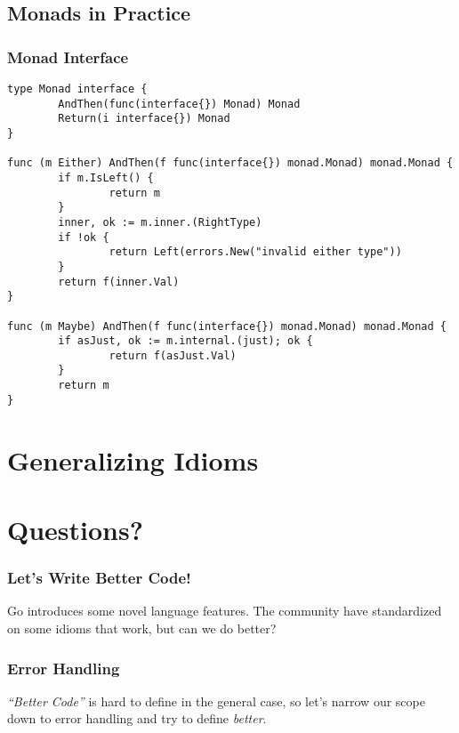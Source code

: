 \documentclass{beamer}
\begin{document}
\subsection{Monads in Practice}

\begin{frame}[fragile]
  \frametitle{Monad Interface}
\begin{lstlisting}
type Monad interface {
        AndThen(func(interface{}) Monad) Monad
        Return(i interface{}) Monad
}

func (m Either) AndThen(f func(interface{}) monad.Monad) monad.Monad {
        if m.IsLeft() {
                return m
        }
        inner, ok := m.inner.(RightType)
        if !ok {
                return Left(errors.New("invalid either type"))
        }
        return f(inner.Val)
}

func (m Maybe) AndThen(f func(interface{}) monad.Monad) monad.Monad {
        if asJust, ok := m.internal.(just); ok {
                return f(asJust.Val)
        }
        return m
}
\end{lstlisting}
\end{frame}
\section{Generalizing Idioms}
\section{Questions?}

\begin{frame}
  \frametitle{Let's Write Better Code!}
  Go introduces some novel language features.  The community have
  standardized on some idioms that work, but can we do better?
\end{frame}

\begin{frame}
  \frametitle{Error Handling}
  {\it ``Better Code''} is hard to define in the general case, so let's
  narrow our scope down to error handling and try to define
  {\it better}.
\end{frame}
\end{document}
